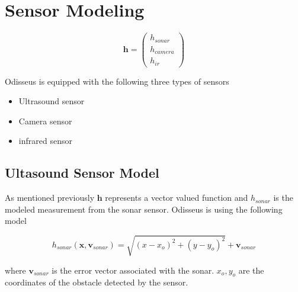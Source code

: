 \section{Sensor Modeling}

\begin{equation}
\mathbf{h} = \begin{pmatrix}
h_{sonar} \\
h_{camera} \\
h_{ir}
\end{pmatrix}
\end{equation}


Odisseus is equipped with the following three types of sensors

\begin{itemize}
	\item Ultrasound sensor
	\item Camera sensor
	\item infrared sensor
\end{itemize}

\subsection{Ultasound Sensor Model}

As mentioned previously $\mathbf{h}$ represents a vector valued function and $h_{sonar}$ is the modeled measurement from the
sonar sensor. Odisseus is using the following model

\begin{equation}
h_{sonar}(\mathbf{x}, \mathbf{v}_{sonar}) = \sqrt{(x - x_o)^2 + (y - y_o)^2} +  \mathbf{v}_{sonar}
\label{sonar_h}
\end{equation} 

where $\mathbf{v}_{sonar}$ is the error vector associated with the sonar. $x_o, y_o$ are the coordinates of the
obstacle detected by the sensor.

